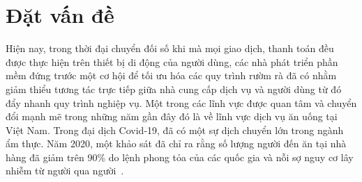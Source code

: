 \chapter*{Đặt vấn đề}\label{chap0}

Hiện nay, trong thời đại chuyển đối số khi mà mọi giao dịch, thanh toán đều được thực hiện trên thiết bị di động của người dùng, các nhà phát triển phần mềm đứng trước một cơ hội để tối ưu hóa các quy trình rườm rà đã có nhằm giảm thiểu tương tác trực tiếp giữa nhà cung cấp dịch vụ và người dùng từ đó đẩy nhanh quy trình nghiệp vụ.
Một trong các lĩnh vực được quan tâm và chuyển đổi mạnh mẽ trong những năm gần đây đó là về lĩnh vực dịch vụ ăn uống tại Việt Nam.
Trong đại dịch Covid-19, đã có một sự dịch chuyển lớn trong ngành ẩm thực.
Năm 2020, một khảo sát đã chỉ ra rằng số lượng người đến ăn tại nhà hàng đã giảm trên 90\% do lệnh phong tỏa của các quốc gia và nỗi sợ nguy cơ lây nhiễm từ người qua người~\cite{dube2021covid}.

